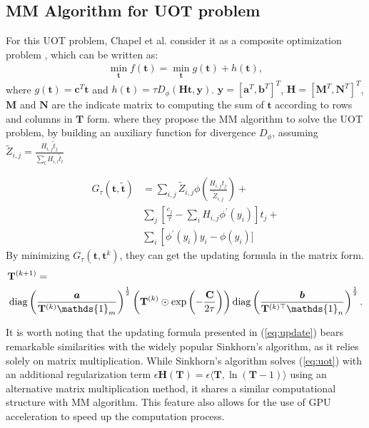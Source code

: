\documentclass[conference]{IEEEtran}
\newcommand{\one}{\mathds{1}}
\newcommand{\mat}[1]{\mathbf{#1}}
\renewcommand{\vec}[1]{\bm{#1}}
\begin{document}
\subsection{MM Algorithm for UOT problem}
For this UOT problem, Chapel et al. consider it as a composite optimization problem \cite{Chapel_NeurIPS_2021}, which can be written as:
\begin{align}
\label{eq:reg}
\min_{\vec t} f(\vec t) = \min_{\vec t} g(\vec t) + h(\vec t),
\end{align}
where $g(\vec t) = \vec c^{T}\vec t$ and $h(\vec t) = \tau D_{\phi}(\mat H \vec t, \vec y)$. $\vec y = [\vec a^{T}, \vec b^{T}]^{T}$, $\mat H = [\mat {M}^{T}, \mat {N}^{T}]^{T}$, $\mat {M} $ and $\mat {N}$ are the indicate matrix to computing the sum of $\vec t$ according to rows and columns in $\mat T$ form.
where they propose the MM algorithm to solve the UOT problem, by building an auxiliary function for divergence $D_{\phi}$, assuming $\tilde{Z}_{i, j}=\frac{H_{i, j} \tilde{t}_j}{\sum_l H_{i, l} \tilde{t}_l}$

\begin{equation}
\begin{aligned}
\label{eq:af}
G_\tau(\boldsymbol{t}, \tilde{\boldsymbol{t}})&=\sum_{i, j} \tilde{Z}_{i, j} \phi\left(\frac{H_{i, j} t_j}{\tilde{Z}_{i, j}}\right)+\\
&\sum_j\left[\frac{c_j}{\tau}-\sum_i H_{i, j} \phi^{\prime}\left(y_i\right)\right] t_j+\\
&\sum_i\left[\phi^{\prime}\left(y_i\right) y_i-\phi\left(y_i\right)]\right .
\end{aligned}
\end{equation}
By minimizing $G_{\tau}( \vec t, \vec t^{k}) $, they can get the updating formula in the matrix form.
\begin{align}
\label{eq:update}
&\mat{T}^{(k+1)}=\notag\\
&\operatorname{diag}\left(\frac{\vec a}{\mat{T}^{(k)} \one_m}\right)^{\frac{1}{2}}\left(\mat{T}^{(k)} \odot \exp \left(-\frac{\mat C}{2 \tau}\right)\right)
\operatorname{diag}\left(\frac{\vec{b}}{\mat{T}^{(k) \top} \one_n}\right)^{\frac{1}{2}}.\notag\\
\end{align}

It is worth noting that the updating formula presented in (\ref{eq:update}) bears remarkable similarities with the widely popular Sinkhorn's algorithm, as it relies solely on matrix multiplication. While Sinkhorn's algorithm solves (\ref{eq:uot}) with an additional regularization term $\epsilon \mat H(\mat T) = \epsilon \langle \mat T,\ln(\mat T - 1)\rangle$ using an alternative matrix multiplication method, it shares a similar computational structure with MM algorithm. This feature also allows for the use of GPU acceleration to speed up the computation process.
\end{document}
